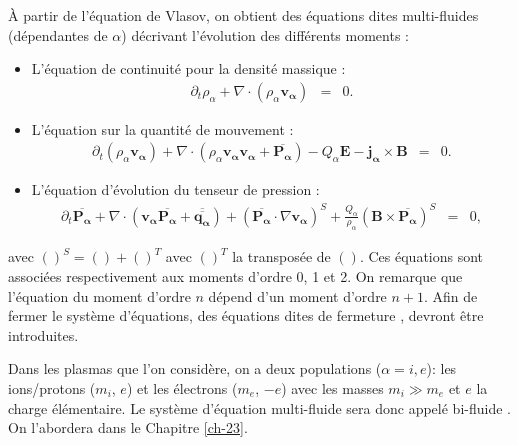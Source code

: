 À partir de l'équation de Vlasov, on obtient des équations dites \og multi-fluides \fg{} (dépendantes de $\alpha$) décrivant l'évolution des différents moments :
\begin{itemize}
    \item L'équation de continuité pour la densité massique :
\begin{eqnarray}
  \label{eq:model_0_multi} \partial_t \rho_{\alpha} + \nabla \cdot \left(\rho_{\alpha} \boldsymbol{v_{\alpha}}\right) &=& 0.
 \end{eqnarray}
    \item L'équation sur la quantité de mouvement :
\begin{eqnarray}
  \label{eq:model_1_multi} \partial_t \left(\rho_{\alpha} \boldsymbol{v_{\alpha}}\right) + \nabla \cdot \left(\rho_{\alpha} \boldsymbol{v_{\alpha}}\boldsymbol{v_{\alpha}} + \overline{\boldsymbol{P_{\alpha}}}\right) - Q_{\alpha} \boldsymbol{E} - \boldsymbol{j_{\alpha}} \times \boldsymbol{B} &=& 0.
 \end{eqnarray}
 \item L'équation d'évolution du tenseur de pression :
\begin{eqnarray}
  \label{eq:model_2_multi} \partial_t \overline{\boldsymbol{P_{\alpha}}} + \nabla \cdot \left(\boldsymbol{v_{\alpha}}\overline{\boldsymbol{P_{\alpha}}} + \overline{\overline{\boldsymbol{q_{\alpha}}}}\right) + \left(\overline{\boldsymbol{P_{\alpha}}} \cdot \nabla \boldsymbol{v_{\alpha}}\right)^S +  \frac{Q_{\alpha}}{\rho_{\alpha}} \left(\boldsymbol{B}\times \overline{\boldsymbol{P_{\alpha}}}\right)^S  &=& 0 ,
\end{eqnarray}
\end{itemize}
avec $\left( \right)^S = \left( \right) + \left( \right)^T$ avec $\left( \right)^T$ la transposée de $\left( \right)$. Ces équations sont associées respectivement aux moments d'ordre 0, 1 et 2. On remarque que l'équation du moment d'ordre $n$ dépend d'un moment d'ordre $n+1$. Afin de fermer le système d'équations, des équations dites \og de fermeture \fg{}, devront être introduites. 

Dans les plasmas que l'on considère, on a deux populations ($\alpha = i,e$): les ions/protons ($m_i$, $e$) et les électrons ($m_e$, $-e$) avec les masses $m_i \gg m_e$ et $e$ la charge élémentaire. Le système d'équation multi-fluide sera donc appelé \og bi-fluide \fg{}. On l'abordera dans le Chapitre \ref{ch-23}. 

